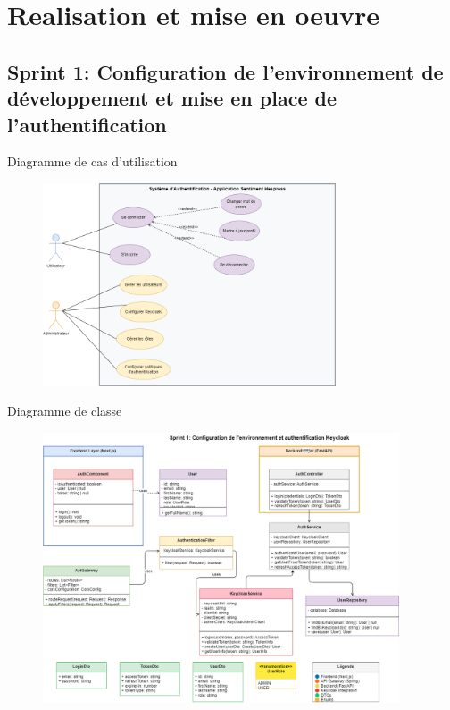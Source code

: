 \section{Realisation et mise en oeuvre}
\subsection{Sprint 1: Configuration de l'environnement de développement et mise en place de l'authentification}
\begin{frame}{Diagramme de cas d'utilisation}

    \begin{figure}[H]
        \centering
        \includegraphics[height=6cm]{assets/images/sprint1-usecase.png}
    \end{figure}
\end{frame}

\begin{frame}{Diagramme de classe}

    \begin{figure}[H]
        \centering
        \includegraphics[height=8cm]{assets/images/sprint1-class.png}
    \end{figure}
\end{frame}

